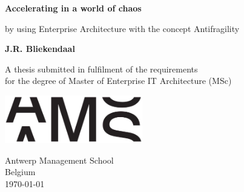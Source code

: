 \begin{titlepage}
	\begin{center}
		\vspace*{1cm}
		
		\Huge
		\textbf{Accelerating in a world of chaos}
		
		\vspace{0.5cm}
		\large
		
		by using Enterprise Architecture with the concept Antifragility
		
		\vspace{1.5cm}
		\Large
		\textbf{J.R. Bliekendaal}
		
		\vfill
		\large
		A thesis submitted in fulfilment of the requirements\\
		for the degree of Master of Enterprise IT Architecture (MSc)
		
		\vspace{0.8cm}
	
			\includegraphics[width=6cm]{images/ams-logo}
		
		\vspace{0.8cm}
		
		\Large
		Antwerp Management School\\
		Belgium\\
		\today
		
	\end{center}
\end{titlepage}